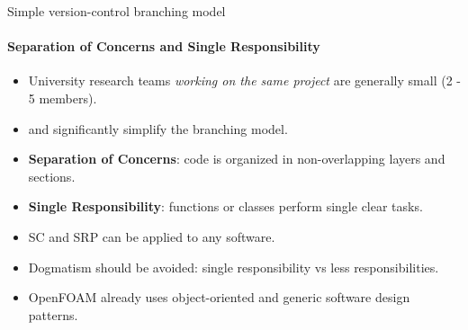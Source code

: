 \begin{frame}{Simple version-control branching model} 
    \framesubtitle{Separation of Concerns and Single Responsibility}

	\vfill
	\begin{itemize}

            \item University research teams \emph{working on the same project} are generally small (2 - 5 members).
            \item \href{https://en.wikipedia.org/wiki/Separation_of_concerns}{} and \href{https://en.wikipedia.org/wiki/Single-responsibility_principle}{} significantly simplify the branching model. 

            \item \textbf{Separation of Concerns}: code is organized in non-overlapping layers and sections. 

            \item \textbf{Single Responsibility}: functions or classes perform single clear tasks.

            \item SC and SRP can be applied to any software.
            \item Dogmatism should be avoided: single responsibility vs less responsibilities. 
            \item OpenFOAM already uses object-oriented and generic software design patterns.  

        \end{itemize}
\end{frame}

